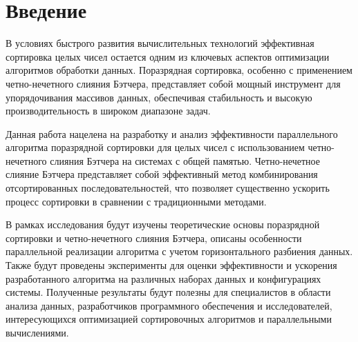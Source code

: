 \documentclass{report}
\begin{document}
\setcounter{page}{2}

\tableofcontents
\newpage

\section*{Введение}
\par В условиях быстрого развития вычислительных технологий эффективная сортировка целых чисел остается одним из ключевых аспектов оптимизации алгоритмов обработки данных. Поразрядная сортировка, особенно с применением четно-нечетного слияния Бэтчера, представляет собой мощный инструмент для упорядочивания массивов данных, обеспечивая стабильность и высокую производительность в широком диапазоне задач.

\par Данная работа нацелена на разработку и анализ эффективности параллельного алгоритма поразрядной сортировки для целых чисел с использованием четно-нечетного слияния Бэтчера на системах с общей памятью. Четно-нечетное слияние Бэтчера представляет собой эффективный метод комбинирования отсортированных последовательностей, что позволяет существенно ускорить процесс сортировки в сравнении с традиционными методами.

\par В рамках исследования будут изучены теоретические основы поразрядной сортировки и четно-нечетного слияния Бэтчера, описаны особенности параллельной реализации алгоритма с учетом горизонтального разбиения данных. Также будут проведены эксперименты для оценки эффективности и ускорения разработанного алгоритма на различных наборах данных и конфигурациях системы. Полученные результаты будут полезны для специалистов в области анализа данных, разработчиков программного обеспечения и исследователей, интересующихся оптимизацией сортировочных алгоритмов и параллельными вычислениями.

\newpage

\end{document}
